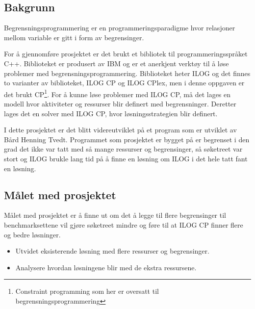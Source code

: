 \subsection{Bakgrunn}
Begrensningsprogrammering er en programmeringsparadigme hvor relasjoner mellom variable er gitt i form av begrensinger.

For å gjennomføre prosjektet er det brukt et bibliotek til programmeringsspråket C++. Biblioteket er produsert av IBM og er et anerkjent verktøy til å løse problemer med begrensningsprogrammering. Biblioteket heter ILOG og det finnes to varianter av biblioteket, ILOG CP og ILOG CPlex, men i denne oppgaven er det brukt CP\footnote{Constraint programming som her er oversatt til begrensningsprogrammering}. For å kunne løse problemer med ILOG CP, må det lages en modell hvor aktiviteter og ressurser blir definert med begrensninger. Deretter lages det en solver med ILOG CP, hvor løsningsstrategien blir definert.

I dette prosjektet er det blitt videreutviklet på et program som er utviklet av Bård Henning Tvedt. Programmet som prosjektet er bygget på er begrenset i den grad det ikke var tatt med så mange ressurser og begrensinger, så søketreet var stort og ILOG brukle lang tid på å finne en løsning om ILOG i det hele tatt fant en løsning.

\subsection{Målet med prosjektet}
Målet med prosjektet er å finne ut om det å legge til flere begrensinger til benchmarksettene vil gjøre søketreet mindre og føre til at ILOG CP finner flere og bedre løsninger.

\begin{itemize}
\item Utvidet eksisterende løsning med flere ressurser og begrensinger.
\item Analysere hvordan løsningene blir med de ekstra ressursene.
\end{itemize}